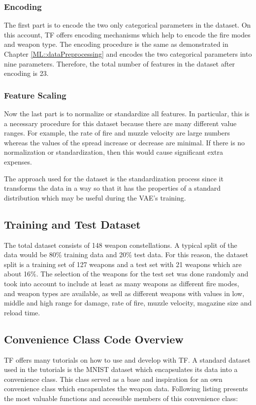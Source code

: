 \documentclass[MGS,Master,english]{twbook}%
\begin{document}
\subsubsection{Encoding}
The first part is to encode the two only categorical parameters in the dataset. On this account, TF offers encoding mechanisms which help to encode the fire modes and weapon type. The encoding procedure is the same as demonstrated in Chapter \ref{ML::dataPreprocessing} and encodes the two categorical parameters into nine parameters. Therefore, the total number of features in the dataset after encoding is 23.

\subsubsection{Feature Scaling}
Now the last part is to normalize or standardize all features. In particular, this is a necessary procedure for this dataset because there are many different value ranges. For example, the rate of fire and muzzle velocity are large numbers whereas the values of the spread increase or decrease are minimal. If there is no normalization or standardization, then this would cause significant extra expenses.

The approach used for the dataset is the standardization process since it transforms the data in a way so that it has the properties of a standard distribution which may be useful during the VAE's training. 

\subsection{Training and Test Dataset}
The total dataset consists of 148 weapon constellations. A typical split of the data would be 80\% training data and 20\% test data. For this reason, the dataset split is a training set of 127 weapons and a test set with 21 weapons which are about 16\%. The selection of the weapons for the test set was done randomly and took into account to include at least as many weapons as different fire modes, and weapon types are available, as well as different weapons with values in low, middle and high range for damage, rate of fire, muzzle velocity, magazine size and reload time.

\subsection{Convenience Class Code Overview}
TF offers many tutorials on how to use and develop with TF. A standard dataset used in the tutorials is the MNIST dataset which encapsulates its data into a convenience class. This class served as a base and inspiration for an own convenience class which encapsulates the weapon data. Following listing presents the most valuable functions and accessible members of this convenience class:
\end{document}
